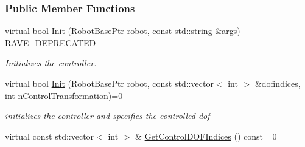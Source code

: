 \subsubsection*{Public Member Functions}
\begin{DoxyCompactItemize}
\item 
virtual bool \hyperlink{classOpenRAVE_1_1ControllerBase_ae61f45e499ec45a2b70ae3a1af53101b}{Init} (RobotBasePtr robot, const std::string \&args) \hyperlink{namespaceOpenRAVE_af23fc4c2c72950a8c02f38ef71680bc6}{RAVE\_\-DEPRECATED}
\begin{DoxyCompactList}\small\item\em Initializes the controller. \item\end{DoxyCompactList}\item 
virtual bool \hyperlink{classOpenRAVE_1_1ControllerBase_a27ba60fa2a3a9f63a64b127369482d9a}{Init} (RobotBasePtr robot, const std::vector$<$ int $>$ \&dofindices, int nControlTransformation)=0
\begin{DoxyCompactList}\small\item\em initializes the controller and specifies the controlled dof \item\end{DoxyCompactList}\item 
\hypertarget{classOpenRAVE_1_1ControllerBase_a4dad85cda4f74030d3d50e0ae37f7d68}{
virtual const std::vector$<$ int $>$ \& \hyperlink{classOpenRAVE_1_1ControllerBase_a4dad85cda4f74030d3d50e0ae37f7d68}{GetControlDOFIndices} () const =0}
\label{classOpenRAVE_1_1ControllerBase_a4dad85cda4f74030d3d50e0ae37f7d68}


\end{DoxyCompactItemize}
